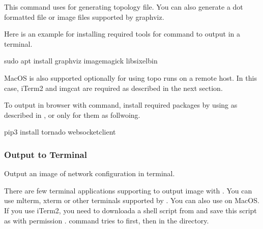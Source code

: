 \documentclass[a4paper,11pt,openany,oneside,english]{sphinxmanual}
\begin{document}
This command uses 
for generating topology file.
You can also generate a dot formatted file or image files supported by
graphviz.

Here is an example for installing required tools for  command
to output in a terminal.

\begin{sphinxVerbatim}[commandchars=\\\{\},formatcom=\footnotesize]
 sudo apt install graphviz 
  imagemagick 
  libsixel\PYGZhy{}bin
\end{sphinxVerbatim}

MacOS is also supported optionally for using topo runs on a remote host.
In this case, iTerm2 and imgcat are required as described in the next
section.

To output in browser with  command, install required packages
by using  as described in
{\hyperref[\detokenize{gsg/install:setup-install-spp}]{}}, or only for them as follwoing.

\begin{sphinxVerbatim}[commandchars=\\\{\},formatcom=\footnotesize]
 pip3 install tornado 
  websocket\PYGZhy{}client
\end{sphinxVerbatim}


\subsubsection{Output to Terminal}
\label{\detokenize{commands/experimental:output-to-terminal}}
Output an image of network configuration in terminal.

\begin{sphinxVerbatim}[commandchars=\\\{\},formatcom=\footnotesize]
\end{sphinxVerbatim}

There are few terminal applications supporting to output image with .
You can use mlterm, xterm or other terminals supported by .
You can also use  on MacOS.
If you use iTerm2, you need to downloada a shell script
 from 
and save this script as
 with permission .
 command tries to  first, then 
in the  directory.
\end{document}
